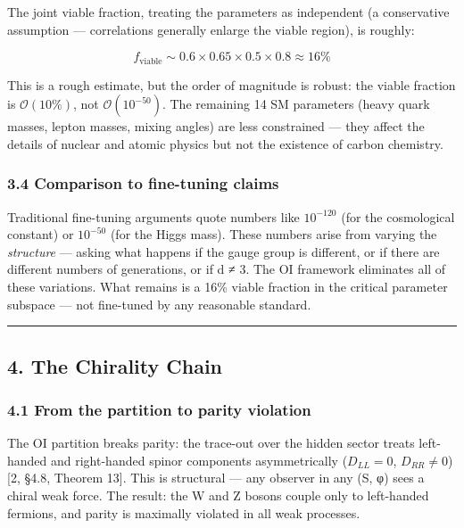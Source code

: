 \documentclass[
]{article}
\begin{document}
The joint viable fraction, treating the parameters as independent (a
conservative assumption --- correlations generally enlarge the viable
region), is roughly:

\[f_{\text{viable}} \sim 0.6 \times 0.65 \times 0.5 \times 0.8 \approx 16\%\]

This is a rough estimate, but the order of magnitude is robust: the
viable fraction is \(\mathcal{O}(10\%)\), not \(\mathcal{O}(10^{-50})\).
The remaining 14 SM parameters (heavy quark masses, lepton masses,
mixing angles) are less constrained --- they affect the details of
nuclear and atomic physics but not the existence of carbon chemistry.

\hypertarget{comparison-to-fine-tuning-claims}{%
\subsubsection{3.4 Comparison to fine-tuning
claims}\label{comparison-to-fine-tuning-claims}}

Traditional fine-tuning arguments quote numbers like \(10^{-120}\) (for
the cosmological constant) or \(10^{-50}\) (for the Higgs mass). These
numbers arise from varying the \emph{structure} --- asking what happens
if the gauge group is different, or if there are different numbers of
generations, or if d ≠ 3. The OI framework eliminates all of these
variations. What remains is a 16\% viable fraction in the critical
parameter subspace --- not fine-tuned by any reasonable standard.

\begin{center}\rule{0.5\linewidth}{0.5pt}\end{center}

\hypertarget{the-chirality-chain}{%
\subsection{4. The Chirality Chain}\label{the-chirality-chain}}

\hypertarget{from-the-partition-to-parity-violation}{%
\subsubsection{4.1 From the partition to parity
violation}\label{from-the-partition-to-parity-violation}}

The OI partition breaks parity: the trace-out over the hidden sector
treats left-handed and right-handed spinor components asymmetrically
(\(D_{LL} = 0\), \(D_{RR} \neq 0\)) {[}2, §4.8, Theorem 13{]}. This is
structural --- any observer in any (S, φ) sees a chiral weak force. The
result: the W and Z bosons couple only to left-handed fermions, and
parity is maximally violated in all weak processes.
\end{document}
